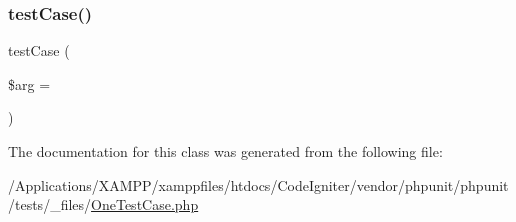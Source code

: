 \mbox{\label{class_one_test_case_ad285be88191f34024fb8653fe642fdc2}} 
\subsubsection{\texorpdfstring{test\+Case()}{testCase()}}
{\footnotesize\ttfamily test\+Case (\begin{DoxyParamCaption}\item[{}]{\$arg = {\ttfamily \textquotesingle{}\textquotesingle{}} }\end{DoxyParamCaption})}



The documentation for this class was generated from the following file\+:\begin{DoxyCompactItemize}
\item 
/\+Applications/\+X\+A\+M\+P\+P/xamppfiles/htdocs/\+Code\+Igniter/vendor/phpunit/phpunit/tests/\+\_\+files/\mbox{\hyperlink{_one_test_case_8php}{One\+Test\+Case.\+php}}\end{DoxyCompactItemize}
